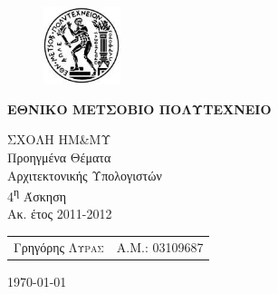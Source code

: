 \begin{titlepage}
    \begin{center}
        \begin{figure}[h] 
            \includegraphics[width=0.2\textwidth]{title/ntua_logo}
        \end{figure}
        \vspace{1cm}
    \begin{LARGE}\textbf{ΕΘΝΙΚΟ ΜΕΤΣΟΒΙΟ ΠΟΛΥΤΕΧΝΕΙΟ\\[1.5cm]}\end{LARGE}
        \begin{Large}
            ΣΧΟΛΗ ΗΜ\&ΜΥ\\[2cm]
            Προηγμένα Θέματα\\
            Αρχιτεκτονικής Υπολογιστών\\[2cm]
            4\textsuperscript{η} Άσκηση\\
            Ακ. έτος 2011-2012\\
        \end{Large}
        \vfill
        \begin{flushright}
            \begin{tabular}{l r}
                {Γρηγόρης \textsc{Λύρας}}&
                {Α.Μ.: 03109687}\\
            \end{tabular}
        \end{flushright}

        \large\today\\
    \end{center}
\end{titlepage}


